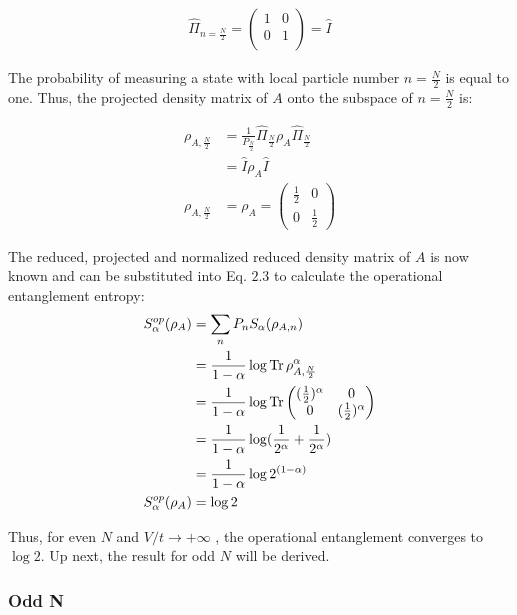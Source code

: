 \begin{samepage}
\begin{equation}
\begin{aligned}
\hat{\Pi}_{n={\frac{N}{2}}} = \begin{pmatrix} 
1&0 \\
0&1 \\
\end{pmatrix} = \hat{I}
\end{aligned}
\end{equation}

The probability of measuring a state with local particle number $n = \frac{N}{2} $ is equal to one. Thus, the projected density matrix of $A$ onto the subspace of $n=\frac{N}{2}$ is:

\begin{align} \rho_{A,\frac{N}{2}} &= \frac{1}{P_{\frac{N}{2}}} \hat{\Pi}_{\frac{N}{2}} \rho_{A} \hat{\Pi}_{\frac{N}{2}} \\ 
& = \hat{I} \rho_{A} \hat{I}  \\
\rho_{A,\frac{N}{2}} &= \rho_{A} = \begin{pmatrix} \frac{1}{2}&0 \\ 0&\frac{1}{2} \end {pmatrix} 
\end{align}

The reduced, projected and normalized reduced density matrix of $A$ is now known and can be substituted into Eq. $2.3$ to calculate the operational entanglement entropy:
\begin {align} 
S_{\alpha}^{op}(\rho_A) &= \sum_{n} P_n S_{\alpha}(\rho_{A,n}) \\
&= \frac{1}{1-\alpha} \log{\operatorname{Tr}{\rho_{A,\frac{N}{2}}^{\alpha}}} \\
&= \frac{1}{1-\alpha} \log{\operatorname{Tr}{\begin{pmatrix}  (\frac{1}{2})^{\alpha} & 0 \\ 0 & (\frac{1}{2})^{\alpha}   \end{pmatrix}}} \\
&= \frac{1}{1-\alpha} \log({\frac{1}{2^{\alpha}} + \frac{1}{2^{\alpha}}}) \\
&= \frac{1}{1-\alpha} \log{2^{(1-\alpha)}} \\
S_{\alpha}^{op}(\rho_A) &= \log{2}
\end {align}

Thus, for even $N$ and $V/t \to + \infty$ , the operational entanglement converges to $\log{2}$. Up next, the result for odd $N$ will be derived.

	\subsubsection{Odd N}
	

\end{samepage}
